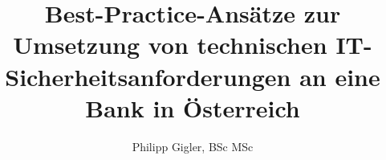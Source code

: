 \documentclass[master,german,smartquotes]{hgbthesis}
\title{Best-Practice-Ansätze zur Umsetzung von technischen IT-Sicherheitsanforderungen an eine Bank in Österreich}
\author{Philipp Gigler, BSc MSc}
\begin{document}

\frontmatter                                       %

\maketitle
\tableofcontents

		
			

\mainmatter                             %









\appendix                                                               %



\backmatter                          %


\MakeBibliography %



\end{document}
